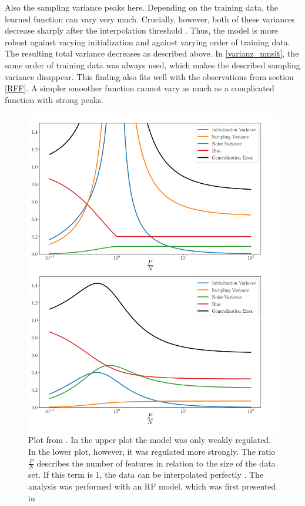 Also the sampling variance peaks here. Depending on the training data, the learned function can vary very much. 
Crucially, however, both of these variances decrease sharply after the interpolation threshold \cite{pmlr-v119-d-ascoli20a}. Thus, the model is more robust against varying initialization and against varying order of training data. The resulting total variance decreases as described above. In \ref{varianz_mnsit}, the same order of training data was always used, which makes the described sampling variance disappear. 
This finding also fits well with the observations from section \ref{RFF}. A simpler smoother function cannot vary as much as a complicated function with strong peaks.

\begin{figure}[!htp]
\centering
\includegraphics[scale=0.45]{Abschlussarbeit_2021/LaTeX/images/variances_ascoli.PNG}
\caption{Plot from \cite{pmlr-v119-d-ascoli20a}. In the upper plot the model was only weakly regulated. In the lower plot, however, it was regulated more strongly. The ratio $\frac{P}{N}$ describes the number of features in relation to the size of the data set. If this term is 1, the data can be interpolated perfectly \cite{belkin}. The analysis was performed with an RF model, which was first presented in \cite{RF-model}}
\label{fig:varianz_ascoli}
\end{figure}


